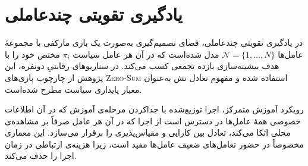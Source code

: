     
    \section{یادگیری تقویتی چندعاملی}\label{sec:marl}
    
    در یادگیری تقویتی چندعاملی،
     فضای تصمیم‌گیری به‌صورت یک بازی مارکفی
      با مجموعهٔ عامل‌ها
      {$\mathcal{N}=\{1,\dots,N\}$} 
      مدل شده‌است که در آن هر عامل سیاست {$\pi_i$} مختص خود را با هدف بیشینه‌سازی بازده تجمعی کسب می‌کند. در سناریوهای رقابتیِ دونفره، این پژوهش از چارچوب بازی‌های \textsc{Zero-Sum} استفاده شده و مفهوم تعادل نش
       به‌عنوان معیار پایداری سیاست مطرح شده‌است.
    
    
    رویکرد آموزش متمرکز، اجرا توزیع‌شده
     \cite{lowe2020multiagentactorcriticmixedcooperativecompetitive} 
     با جداکردن مرحله‌ی آموزش که در آن اطلاعات خصوصی همهٔ عامل‌ها در دسترس است از اجرا که در آن هر عامل صرفاً بر مشاهده‌ی محلی اتکا می‌کند، تعادل بین کارایی و مقیاس‌پذیری را برقرار می‌سازد. این معماری مخصوصاً در حضور تعامل‌های ضعیف عامل‌ها مفید است، زیرا هزینه‌ی ارتباطی در زمان اجرا را حذف می‌کند.
    
%    
%    
    